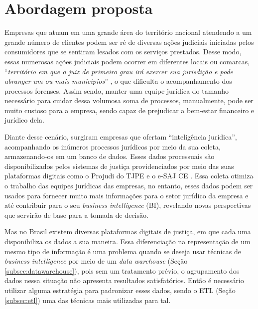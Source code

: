 \section{Abordagem proposta}

Empresas que atuam em uma grande área do território nacional atendendo a um grande número de clientes podem ser ré de diversas ações judiciais iniciadas pelos consumidores que se sentiram lesados com os serviços prestados. Desse modo, essas numerosas ações judiciais podem ocorrer em diferentes locais ou comarcas, \enquote{\textit{território em que o juiz de primeiro grau irá exercer sua jurisdição e pode abranger um ou mais municípios}} \cite{cnj:comarca}, o que dificulta o acompanhamento dos processos forenses. Assim sendo, manter uma equipe jurídica do tamanho necessário para cuidar dessa volumosa soma de processos, manualmente, pode ser muito custoso para a empresa, sendo capaz de prejudicar a bem-estar financeiro e jurídico dela.

Diante desse cenário, surgiram empresas que ofertam \enquote{inteligência jurídica}, acompanhando os inúmeros processos jurídicos por meio da sua coleta, armazenando-os em um banco de dados. Esses dados processuais são disponibilizados pelos sistemas de justiça providenciados por meio das suas plataformas digitais como o Projudi do TJPE \cite{tjpe} e o e-SAJ CE \cite{esajce}. Essa coleta otimiza o trabalho das equipes jurídicas das empresas, no entanto, esses dados podem ser usados para fornecer muito mais informações para o setor jurídico da empresa e até contribuir para o seu \textit{business intelligence} (BI), revelando novas perspectivas que servirão de base para a tomada de decisão.

Mas no Brasil existem diversas plataformas digitais de justiça, em que cada uma disponibiliza os dados a sua maneira. Essa diferenciação na representação de um mesmo tipo de informação é uma problema quando se deseja usar técnicas de \textit{business intelligence} por meio de um \textit{data warehouse} (Seção \ref{subsec:datawarehouse}), pois sem um tratamento prévio, o agrupamento dos dados nessa situação não apresenta resultados satisfatórios. Então é necessário utilizar alguma estratégia para padronizar esses dados, sendo o ETL (Seção \ref{subsec:etl}) uma das técnicas mais utilizadas para tal.